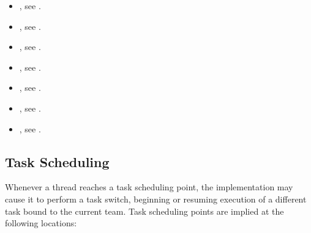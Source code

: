 \crossreferences
\begin{itemize}
\item {}, see .

\item {}, see .

\item {},
see .

\item {},
see .

\item {},
see .

\item {},
see .

\item {}, see
  .
\end{itemize}

\subsection{Task Scheduling}
\label{subsec:Task Scheduling}
Whenever a thread reaches a task scheduling point, the implementation may cause it to
perform a task switch, beginning or resuming execution of a different task bound to the
current team. Task scheduling points are implied at the following locations:


